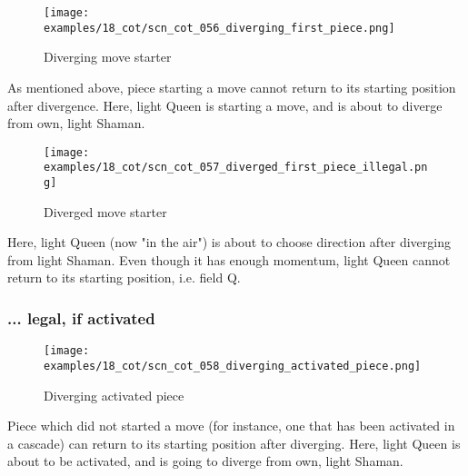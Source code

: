 \vspace*{-0.9\baselineskip}
\noindent
\begin{wrapfigure}[6]{l}{0.4\textwidth}
\centering
\texttt{[image: examples/18\_cot/scn\_cot\_056\_diverging\_first\_piece.png]}
\vspace*{-0.4\baselineskip}
\caption{Diverging move starter}
\label{fig:scn_cot_056_diverging_first_piece}
\end{wrapfigure}
As mentioned above, piece starting a move cannot return to its starting position
after divergence. \newline
\indent
Here, light Queen is starting a move, and is about to diverge from own, light Shaman.

\vspace*{3.9\baselineskip}
\noindent
\begin{wrapfigure}[6]{l}{0.4\textwidth}
\centering
\texttt{[image: examples/18\_cot/scn\_cot\_057\_diverged\_first\_piece\_illegal.png]}
\vspace*{-0.4\baselineskip}
\caption{Diverged move starter}
\label{fig:scn_cot_057_diverged_first_piece_illegal}
\end{wrapfigure}
Here, light Queen (now "in the air") is about to choose direction after diverging
from light Shaman. Even though it has enough momentum, light Queen cannot return
to its starting position, i.e. field Q.

\clearpage %

\subsubsection*{... legal, if activated}
\label{sec:Conquest of Tlalocan/Divergence/Diverging to starting position/... legal, if activated}

\vspace*{-0.9\baselineskip}
\noindent
\begin{wrapfigure}[7]{l}{0.4\textwidth}
\centering
\texttt{[image: examples/18\_cot/scn\_cot\_058\_diverging\_activated\_piece.png]}
\vspace*{-0.4\baselineskip}
\caption{Diverging activated piece}
\label{fig:scn_cot_058_diverging_activated_piece}
\end{wrapfigure}
Piece which did not started a move (for instance, one that has been activated
in a cascade) can return to its starting position after diverging. \newline
\indent
Here, light Queen is about to be activated, and is going to diverge from own,
light Shaman.

